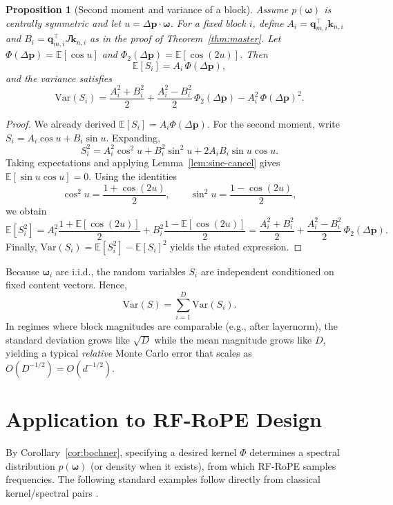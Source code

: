 \documentclass{article}
\theoremstyle{plain}
\newtheorem{proposition}[theorem]{Proposition}
\theoremstyle{remark}
\begin{document}
\begin{proposition}[Second moment and variance of a block]
\label{prop:var}
Assume $p(\boldsymbol{\omega})$ is centrally symmetric and let $u=\Delta\mathbf{p}\cdot\boldsymbol{\omega}$. For a fixed block $i$, define
$A_i=\mathbf{q}_{m,i}^\top \mathbf{k}_{n,i}$ and $B_i=\mathbf{q}_{m,i}^\top J\mathbf{k}_{n,i}$ as in the proof of Theorem~\ref{thm:master}.
Let $\Phi(\Delta\mathbf{p})=\mathbb{E}[\cos u]$ and $\Phi_2(\Delta\mathbf{p})=\mathbb{E}[\cos(2u)]$.
Then
\[
\mathbb{E}[S_i] = A_i\,\Phi(\Delta\mathbf{p}),
\]
and the variance satisfies
\[
\mathrm{Var}(S_i)
=
\frac{A_i^2+B_i^2}{2}
+
\frac{A_i^2-B_i^2}{2}\,\Phi_2(\Delta\mathbf{p})
-
A_i^2\,\Phi(\Delta\mathbf{p})^2.
\]
\end{proposition}

\begin{proof}
We already derived $\mathbb{E}[S_i]=A_i\Phi(\Delta\mathbf{p})$.
For the second moment, write $S_i=A_i\cos u + B_i\sin u$. Expanding,
\[
S_i^2 = A_i^2\cos^2 u + B_i^2\sin^2 u + 2A_iB_i\sin u\cos u.
\]
Taking expectations and applying Lemma~\ref{lem:sine-cancel} gives $\mathbb{E}[\sin u\cos u]=0$.
Using the identities
\[
\cos^2 u=\frac{1+\cos(2u)}{2},\qquad \sin^2 u=\frac{1-\cos(2u)}{2},
\]
we obtain
\[
\mathbb{E}[S_i^2]
=
A_i^2\frac{1+\mathbb{E}[\cos(2u)]}{2}
+
B_i^2\frac{1-\mathbb{E}[\cos(2u)]}{2}
=
\frac{A_i^2+B_i^2}{2}+\frac{A_i^2-B_i^2}{2}\,\Phi_2(\Delta\mathbf{p}).
\]
Finally,
$\mathrm{Var}(S_i)=\mathbb{E}[S_i^2]-\mathbb{E}[S_i]^2$
yields the stated expression.
\end{proof}

Because $\boldsymbol{\omega}_i$ are i.i.d., the random variables $S_i$ are independent conditioned on fixed content vectors. Hence,
\[
\mathrm{Var}(S)=\sum_{i=1}^{D}\mathrm{Var}(S_i).
\]
In regimes where block magnitudes are comparable (e.g., after layernorm), the standard deviation grows like $\sqrt{D}$ while the mean magnitude grows like $D$, yielding a typical \emph{relative} Monte Carlo error that scales as $O(D^{-1/2})=O(d^{-1/2})$.

\section{Application to RF-RoPE Design}
By Corollary~\ref{cor:bochner}, specifying a desired kernel $\Phi$ determines a spectral distribution $p(\boldsymbol{\omega})$ (or density when it exists), from which RF-RoPE samples frequencies. The following standard examples follow directly from classical kernel/spectral pairs \cite{rasmussen2006gpml,rahimi2007random}.
\end{document}
